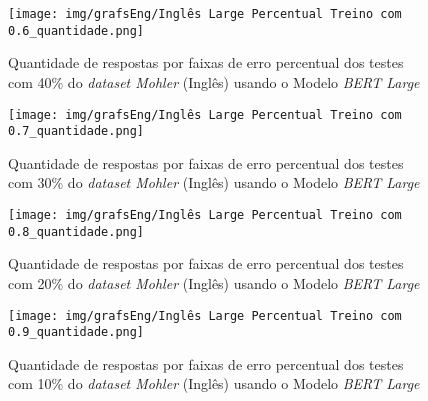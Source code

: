 
\begin{figure}[h!]
\texttt{[image: img/grafsEng/Inglês Large Percentual Treino com 0.6\_quantidade.png]}
\caption{Quantidade de respostas por faixas de erro percentual dos testes com 40\% do \textit{dataset Mohler} (Inglês) usando o Modelo \textit{BERT Large}}\label{figure:20}
\end{figure}

\begin{figure}[h!]
\texttt{[image: img/grafsEng/Inglês Large Percentual Treino com 0.7\_quantidade.png]}
\caption{Quantidade de respostas por faixas de erro percentual dos testes com 30\% do \textit{dataset Mohler} (Inglês) usando o Modelo \textit{BERT Large}}\label{figure:21}
\end{figure}

\begin{figure}[h!]
\texttt{[image: img/grafsEng/Inglês Large Percentual Treino com 0.8\_quantidade.png]}
\caption{Quantidade de respostas por faixas de erro percentual dos testes com 20\% do \textit{dataset Mohler} (Inglês) usando o Modelo \textit{BERT Large}}\label{figure:22}
\end{figure}

\begin{figure}[h!]
\texttt{[image: img/grafsEng/Inglês Large Percentual Treino com 0.9\_quantidade.png]}
\caption{Quantidade de respostas por faixas de erro percentual dos testes com 10\% do \textit{dataset Mohler} (Inglês) usando o Modelo \textit{BERT Large}}\label{figure:23}
\end{figure}